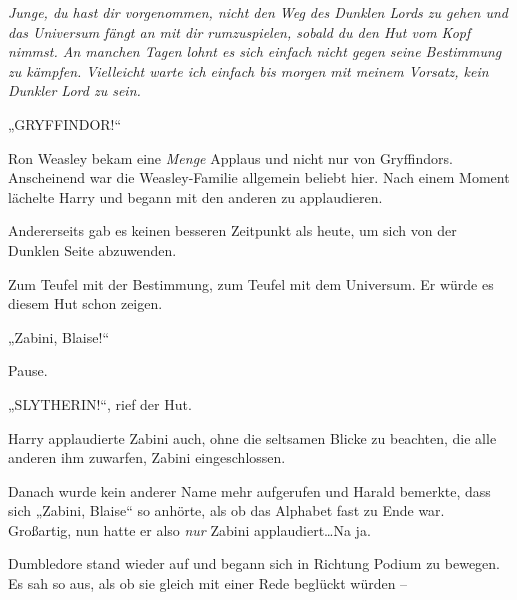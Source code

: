 \emph{Junge, du hast dir vorgenommen, nicht den Weg des Dunklen Lords zu gehen und das Universum fängt an mit dir rumzuspielen, sobald du den Hut vom Kopf nimmst. An manchen Tagen lohnt es sich einfach nicht gegen seine Bestimmung zu kämpfen. Vielleicht warte ich einfach bis morgen mit meinem Vorsatz, kein Dunkler Lord zu sein.}

„GRYFFINDOR!“

Ron Weasley bekam eine \emph{Menge} Applaus und nicht nur von Gryffindors. Anscheinend war die Weasley-Familie allgemein beliebt hier. Nach einem Moment lächelte Harry und begann mit den anderen zu applaudieren.

Andererseits gab es keinen besseren Zeitpunkt als heute, um sich von der Dunklen Seite abzuwenden.

Zum Teufel mit der Bestimmung, zum Teufel mit dem Universum. Er würde es diesem Hut schon zeigen.

„Zabini, Blaise!“

Pause.

„SLYTHERIN!“, rief der Hut.

Harry applaudierte Zabini auch, ohne die seltsamen Blicke zu beachten, die alle anderen ihm zuwarfen, Zabini eingeschlossen.

Danach wurde kein anderer Name mehr aufgerufen und Harald bemerkte, dass sich „Zabini, Blaise“ so anhörte, als ob das Alphabet fast zu Ende war. Großartig, nun hatte er also \emph{nur} Zabini applaudiert…Na ja.

Dumbledore stand wieder auf und begann sich in Richtung Podium zu bewegen. Es sah so aus, als ob sie gleich mit einer Rede beglückt würden –

